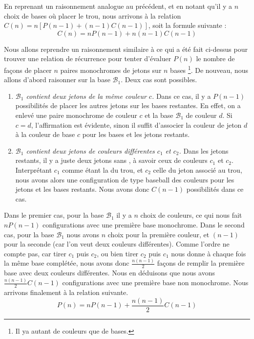 \medskip

En reprenant un raisonnement analogue au précédent, et en notant qu'il y a $n$ choix de bases où placer le trou, nous arrivons à la relation $C(n) = n \left[ P(n - 1) + (n-1) C(n-1) \right]$, soit la formule suivante :
\begin{equation}
    C(n) = n P(n - 1) + n(n-1) C(n-1)
\end{equation}


Nous allons reprendre un raisonnement similaire à ce qui a été fait ci-dessus pour trouver une relation de récurrence pour tenter d'évaluer $P(n)$ le nombre de façons de placer $n$ paires monochromes de jetons sur $n$ bases
\footnote{
   Il ya autant de couleurs que de bases.
}.
De nouveau, nous allons d'abord raisonner sur la base $\mathcal{B}_1$. Deux cas sont possibles.

\begin{enumerate}
    \item \textit{$\mathcal{B}_1$ contient deux jetons de la même couleur $c$.}
    Dans ce cas, il y a $P(n - 1)$ possibilités de placer les autres jetons sur les bases restantes. En effet, on a enlevé une paire monochrome de couleur $c$ et la base $\mathcal{B}_1$ de couleur $d$. Si $c = d$, l'affirmation est évidente, sinon il suffit d'associer la couleur de jeton $d$ à la couleur de base $c$ pour les bases et les jetons restants.
        
    \item \textit{$\mathcal{B}_1$ contient deux jetons de couleurs différentes $c_1$ et $c_2$.}
    Dans les jetons restants, il y a juste deux jetons sans , à savoir ceux de couleurs $c_1$ et $c_2$. Interprétant $c_1$ comme étant la  du trou, et $c_2$ celle du jeton associé au trou, nous avons alors une configuration de type baseball des couleurs pour les jetons et les bases restants. Nous avons donc $C(n - 1)$ possibilités dans ce cas.
\end{enumerate}


\medskip

Dans le premier cas, pour la base $\mathcal{B}_1$ il y a $n$ choix de couleurs, ce qui nous fait $n P(n - 1)$ configurations avec une première base monochrome.
Dans le second cas, pour la base $\mathcal{B}_1$ nous avons $n$ choix pour la première couleur, et $(n - 1)$ pour la seconde (car l'on veut deux couleurs différentes).
Comme l'ordre ne compte pas, car tirer $c_1$ puis $c_2$, ou bien tirer $c_2$ puis $c_1$ nous donne à chaque fois la même base complétée, nous avons donc $\frac{n(n - 1)}{2}$ façons de remplir la première base avec deux couleurs différentes.
Nous en déduisons que nous avons $\frac{n(n-1)}{2} C(n - 1)$ configurations avec une première base non monochrome.
Nous arrivons finalement à la relation suivante.
\begin{equation}
    P(n) = n P(n - 1) + \dfrac{n(n-1)}{2} C(n - 1)
\end{equation}


